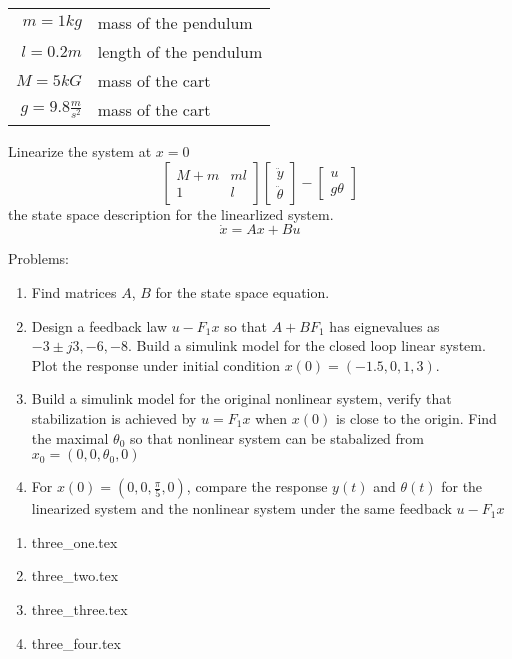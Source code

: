 {  \begin{tabular}{r|l}
    $m=1kg$ & mass of the pendulum\\
    $l=0.2m$ & length of the pendulum\\
    $M = 5kG$ & mass of the cart\\
    $g = 9.8\frac m {s^2}$ & mass of the cart
  \end{tabular}
  
  Linearize the system at $x=0$
  \begin{equation}
    \begin{bmatrix}
      M+m & ml \\
      1 & l
    \end{bmatrix}
    \begin{bmatrix}
      \ddot y\\
      \ddot \theta
    \end{bmatrix} -
    \begin{bmatrix}
      u \\
      g\theta
    \end{bmatrix}
  \end{equation}
  the state space description for the linearlized system.
  \begin{equation}
    \dot x = Ax + Bu
  \end{equation}

  Problems:
  \begin{enumerate}[\arabic*.]
  \item Find matrices $A$, $B$ for the state space equation.
  \item Design a feedback law $u-F_1x$  so that $A+BF_1$ has eignevalues as $-3\pm j3, -6, -8$. Build a simulink
    model for the closed loop linear system. Plot the response under initial condition
    $x(0) = (-1.5, 0, 1, 3)$.
  \item Build a simulink model for the original nonlinear system, verify that stabilization is achieved by
    $u=F_1x$ when $x(0)$ is close to the origin. Find the maximal $\theta_0$ so that nonlinear system can be
    stabalized from $x_0 = (0, 0, \theta_0,0)$
  \item For $x(0)=(0,0, \frac{\pi} 5,0)$, compare the response $y(t)$ and
    $\theta(t)$ for the linearized system and the nonlinear system under the same feedback $u - F_1x$
  \end{enumerate}
}{%
  \begin{enumerate}[\arabic*.]
  \item {three_one.tex}
  \item {three_two.tex}
  \item {three_three.tex}
  \item {three_four.tex}
  \end{enumerate}
}{}

